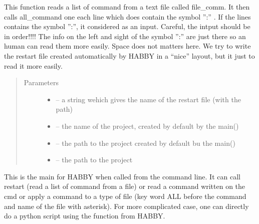 \documentclass[letterpaper,10pt,english]{sphinxmanual}
\begin{document}

\begin{fulllineitems}
\label{\detokenize{index:habby_cmd.habby_restart}}
This function reads a list of command from a text file called file\_comm. It then calls all\_command one each line
which does contain the symbol '':'' . If the lines contains the symbol '':'', it considered as an input.
Careful, the intput should be in order!!!! The info on the left and sight of the symbol '':'' are just there so
an human can read them more easily. Space does not matters here. We try to write the restart file created
automatically by HABBY in a ``nice'' layout, but it just to  read it more easily.
\begin{quote}\begin{description}
\item[{Parameters}] \leavevmode\begin{itemize}
\item {} 
 -- a string wehich gives the name of the restart file (with the path)

\item {} 
 -- the name of the project, created by default by the main()

\item {} 
 -- the path to the project created by default bu the main()

\item {} 
 -- the path to the project

\end{itemize}

\end{description}\end{quote}

\end{fulllineitems}


\begin{fulllineitems}
\label{\detokenize{index:habby_cmd.main}}
This is the main for HABBY when called from the command line. It can call restart (read a list of command from a
file) or read a command written on the cmd or apply a command to a type of file (key word ALL before the command and
name of the file with asterisk). For more complicated case, one can directly do a python script using the function
from HABBY.

\end{fulllineitems}
\end{document}

